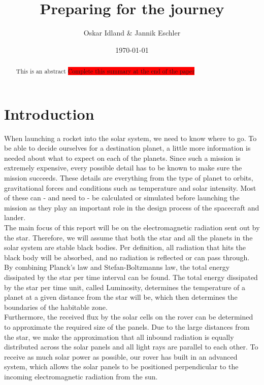 \documentclass[reprint,english,notitlepage]{revtex4-2}
\begin{document}
\title{Preparing for the journey}
\author{Oskar Idland \& Jannik Eschler}
\date{\today}

\begin{abstract}
This is an abstract \colorbox{red}{Complete this summary at the end of the paper}
\end{abstract}
\maketitle


\section{Introduction} \label{sec:introduction}
When launching a rocket into the solar system, we need to know where to go.
To be able to decide ourselves for a destination planet, a little more information is needed about what to expect on each of the planets.
Since such a mission is extremely expensive, every possible detail has to be known to make sure the mission succeeds.
These details are everything from the type of planet to orbits, gravitational forces and conditions such as temperature and solar intensity.
Most of these can - and need to - be calculated or simulated before launching the mission as they play an important role in the design process of the spacecraft and lander.\\
The main focus of this report will be on the electromagnetic radiation sent out by the star.
Therefore, we will assume that both the star and all the planets in the solar system are stable black bodies.
Per definition, all radiation that hits the black body will be absorbed, and no radiation is reflected or can pass through.\\
By combining Planck's law and Stefan-Boltzmanns law, the total energy dissipated by the star per time interval can be found.
The total energy dissipated by the star per time unit, called Luminosity, determines the temperature of a planet at a given distance from the star will be, which then determines the boundaries of the habitable zone.\\
Furthermore, the received flux by the solar cells on the rover can be determined to approximate the required size of the panels.
Due to the large distances from the star, we make the approximation that all inbound radiation is equally distributed across the solar panels and all light rays are parallel to each other.
To receive as much solar power as possible, our rover has built in an advanced system, which allows the solar panels to be positioned perpendicular to the incoming electromagnetic radiation from the sun.\\
\end{document}
